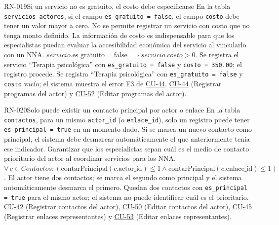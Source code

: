 \begin{BussinesRule}[%
	\brClassification{\btEnabler}{\bcCondition}{\blStrict}%
	]{RN-019}{Si un servicio no es gratuito, el costo debe especificarse}
	\BRitem[Descripción:] En la tabla \texttt{servicios\_actores}, si el campo \texttt{es\_gratuito = false}, el campo \texttt{costo} debe tener un valor mayor a cero. No se permite registrar un servicio con costo que no tenga monto definido.
	\BRitem[Motivación:] La información de costo es indispensable para que los especialistas puedan evaluar la accesibilidad económica del servicio al vincularlo con un NNA.
	\BRitem[Sentencia:] $servicio.\text{es\_gratuito} = \text{false} \implies servicio.costo > 0$.
	 Se registra el servicio ``Terapia psicológica'' con \texttt{es\_gratuito = false} y \texttt{costo = 350.00}; el registro procede.
	 Se registra ``Terapia psicológica'' con \texttt{es\_gratuito = false} y \texttt{costo} vacío; el sistema muestra el error E3 de \hyperlink{CU-44}{CU-44}.
	 \hyperlink{CU-44}{CU-44} (Registrar programas del actor) y \hyperlink{CU-52}{CU-52} (Editar programas del actor).
\end{BussinesRule}

\begin{BussinesRule}[%
	\brClassification{\btEnabler}{\bcCondition}{\blStrict}%
	]{RN-020}{Solo puede existir un contacto principal por actor o enlace}
	\BRitem[Descripción:] En la tabla \texttt{contactos}, para un mismo \texttt{actor\_id} (o \texttt{enlace\_id}), solo un registro puede tener \texttt{es\_principal = true} en un momento dado. Si se marca un nuevo contacto como principal, el sistema debe desmarcar automáticamente el que anteriormente tenía ese indicador.
	\BRitem[Motivación:] Garantizar que los especialistas sepan cuál es el medio de contacto prioritario del actor al coordinar servicios para los NNA.
	\BRitem[Sentencia:] $\forall \, c \in Contactos : (\text{contarPrincipal}(c.\text{actor\_id}) \le 1 \land \text{contarPrincipal}(c.\text{enlace\_id}) \le 1)$.
	 El actor tiene dos contactos; se marca el segundo como principal y el sistema automáticamente desmarca el primero.
	 Quedan dos contactos con \texttt{es\_principal = true} para el mismo actor; el sistema no puede identificar cuál es el prioritario.
	 \hyperlink{CU-42}{CU-42} (Registrar contactos del actor), \hyperlink{CU-50}{CU-50} (Editar contactos del actor), \hyperlink{CU-45}{CU-45} (Registrar enlaces representantes) y \hyperlink{CU-53}{CU-53} (Editar enlaces representantes).
\end{BussinesRule}

